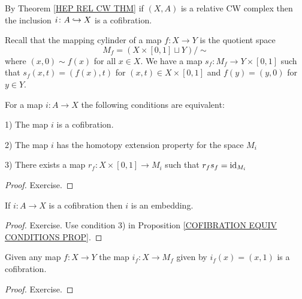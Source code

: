 \begin{example}
By Theorem \ref{HEP REL CW THM} if $(X, A)$ is a relative CW complex then the inclusion 
$i\colon A \hookrightarrow X$ is a cofibration.
\end{example}

Recall that the mapping cylinder of a map $f\colon X \to Y$ is the quotient space 
\[
M_{f} = (X \times [0, 1] \sqcup Y) / {\sim}
\]
where $(x, 0) \sim f(x)$ for all $x\in X$. We have a map $s_{f}\colon M_{f} \to Y\times [0, 1]$
such that $s_{f}(x, t) = (f(x), t)$ for $(x, t)\in X\times [0, 1]$ and $f(y) = (y, 0)$ for 
$y\in Y$. 

\begin{proposition}
\label{COFIBRATION EQUIV CONDITIONS PROP}
For a map $i\colon A\to X$ the following conditions are equivalent:
\benu
\item[1)] The map $i$ is a cofibration.
\item[2)] The map $i$ has the homotopy extension property for the space $M_{i}$
\item[3)] There exists a map 
$r_{f}\colon X\times [0, 1] \to M_{i}$ such that $r_{f}s_{f} = \mathrm{id}_{M_{i}}$
\eenu
\end{proposition}

\begin{proof}
Exercise.
\end{proof}

\begin{corollary}
\label{COFIBRATIONS ARE EMBEDDINGS COR}
If $i\colon A \to X$ is a cofibration then $i$ is an embedding.
\end{corollary}

\begin{proof}
Exercise. Use condition 3) in Proposition \ref{COFIBRATION EQUIV CONDITIONS PROP}.
\end{proof}

\begin{proposition}
\label{CYLINDER COFIBR PROP}
Given any map $f\colon X \to Y$ the map $i_{f}\colon X \to M_{f}$ given by 
$i_{f}(x) = (x, 1)$ is a cofibration. 
\end{proposition}

\begin{proof}
Exercise.
\end{proof}


